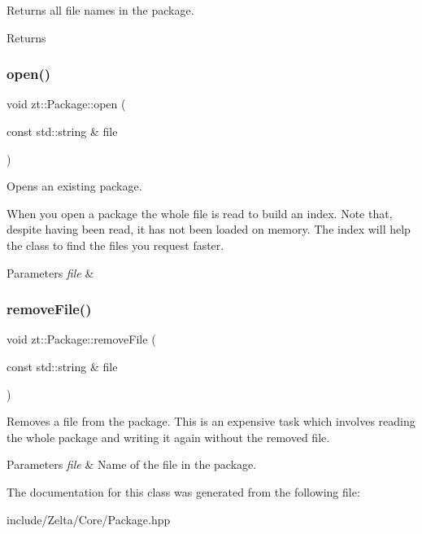 Returns all file names in the package. \begin{DoxyReturn}{Returns}

\end{DoxyReturn}
\mbox{\label{classzt_1_1_package_a30d7195cbd7b4856dda6207fd8ec785b}} 
\subsubsection{\texorpdfstring{open()}{open()}}
{\footnotesize\ttfamily void zt\+::\+Package\+::open (\begin{DoxyParamCaption}\item[{const std\+::string \&}]{file }\end{DoxyParamCaption})}



Opens an existing package. 

When you open a package the whole file is read to build an index. Note that, despite having been read, it has not been loaded on memory. The index will help the class to find the files you request faster. 
\begin{DoxyParams}{Parameters}
{\em file} & \\
\hline
\end{DoxyParams}
\mbox{\label{classzt_1_1_package_af62e37955ffe46a4c37cd76c99405763}} 
\subsubsection{\texorpdfstring{remove\+File()}{removeFile()}}
{\footnotesize\ttfamily void zt\+::\+Package\+::remove\+File (\begin{DoxyParamCaption}\item[{const std\+::string \&}]{file }\end{DoxyParamCaption})}



Removes a file from the package. This is an expensive task which involves reading the whole package and writing it again without the removed file. 


\begin{DoxyParams}{Parameters}
{\em file} & Name of the file in the package. \\
\hline
\end{DoxyParams}


The documentation for this class was generated from the following file\+:\begin{DoxyCompactItemize}
\item 
include/\+Zelta/\+Core/Package.\+hpp\end{DoxyCompactItemize}
